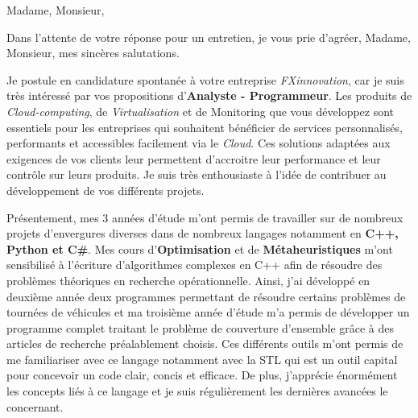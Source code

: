\date{\today}
\opening{Madame, Monsieur,}
\closing{Dans l'attente de votre réponse pour un entretien, je vous prie d'agréer, Madame, Monsieur, mes sincères salutations.}

\makelettertitle

\introduction{}
 Je postule en candidature spontanée à votre entreprise \textit{FXinnovation}, car je suis très intéressé par vos propositions d'\textbf{Analyste - Programmeur}. Les produits de \textit{Cloud-computing}, de \textit{Virtualisation} et de Monitoring que vous développez sont essentiels pour les entreprises qui souhaitent bénéficier de services personnalisés, performants et accessibles facilement via le \textit{Cloud}. Ces solutions adaptées aux exigences de vos clients leur permettent d'accroitre leur performance et leur contrôle sur leurs produits. Je suis très enthousiaste à l'idée de contribuer au développement de vos différents projets.

Présentement, mes 3 années d'étude m'ont permis de travailler sur de nombreux projets d'envergures diverses dans de nombreux langages notamment en \textbf{C++, Python et C\#}. Mes cours d'\textbf{Optimisation} et de \textbf{Métaheuristiques} m'ont sensibilisé à l'écriture d'algorithmes complexes en C++ afin de résoudre des problèmes théoriques en recherche opérationnelle. Ainsi, j'ai développé en deuxième année deux programmes permettant de résoudre certains problèmes de tournées de véhicules et ma troisième année d'étude m'a permis de développer un programme complet traitant le problème de couverture d'ensemble grâce à des articles de recherche préalablement choisis. Ces différents outils m'ont permis de me familiariser avec ce langage notamment avec la STL qui est un outil capital pour concevoir un code clair, concis et efficace. De plus, j'apprécie énormément les concepts liés à ce langage et je suis régulièrement les dernières avancées le concernant.

